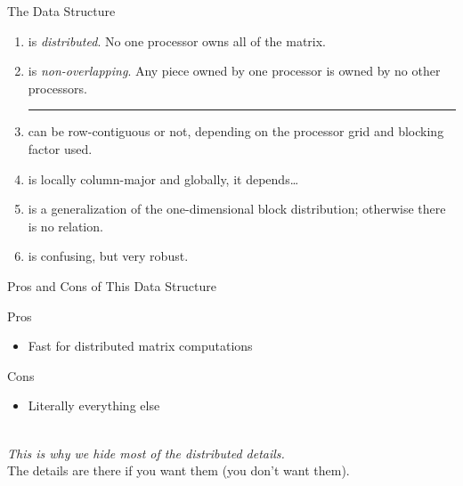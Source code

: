 \begin{frame}[fragile]
  \begin{block}{The  Data Structure}\pause
  \begin{enumerate}
    \item {} is \emph{distributed}.  No one processor owns all of the matrix.
    \item {} is \emph{non-overlapping}. Any piece owned by one processor is owned by no other processors.\\\hrule
    \item {} can be row-contiguous or not, depending on the processor grid and blocking factor used.
    \item {} is locally column-major and globally, it depends\dots
    \item {} is a generalization of the one-dimensional block  distribution; otherwise there is no relation.
    \item {} is confusing, but very robust.
  \end{enumerate}
  \end{block}
\end{frame}


\begin{frame}
  \begin{block}{Pros and Cons of This Data Structure}\pause
  \begin{center}
    \begin{minipage}[t]{.45\textwidth}
      \begin{center}
      \begin{block}{Pros}
	\begin{itemize}
	\item Fast for distributed matrix computations
	\end{itemize}
      \end{block}
      \end{center}
    \end{minipage}\hspace{.5cm}
    \begin{minipage}[t]{.45\textwidth}
      \begin{center}
      \begin{block}{Cons}
	\begin{itemize}
	  \item Literally everything else
	\end{itemize}
      \end{block}
      \end{center}
    \end{minipage}
    \\[.6cm]
    \emph{This is why we hide most of the distributed details.}
    \\[.4cm]
    The details are there if you want them (you don't want them).
  \end{center}
  \end{block}
\end{frame}




